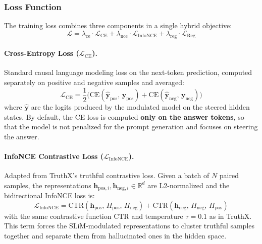 \subsubsection{Loss Function}

The training loss combines three components in a single hybrid objective:
\begin{equation}
\label{eq:slimtruth_loss}
\mathcal{L} = \lambda_{\mathrm{ce}} \cdot \mathcal{L}_{\mathrm{CE}} + \lambda_{\mathrm{nce}} \cdot \mathcal{L}_{\mathrm{InfoNCE}} + \lambda_{\mathrm{reg}} \cdot \mathcal{L}_{\mathrm{Reg}}
\end{equation}

\paragraph{Cross-Entropy Loss ($\mathcal{L}_{\mathrm{CE}}$).}
Standard causal language modeling loss on the next-token prediction, computed separately on positive and negative samples and averaged:
\begin{equation}
\label{eq:slimtruth_ce}
\mathcal{L}_{\mathrm{CE}} = \frac{1}{2}\Big(\mathrm{CE}(\hat{\mathbf{y}}_{\mathrm{pos}},\, \mathbf{y}_{\mathrm{pos}}) + \mathrm{CE}(\hat{\mathbf{y}}_{\mathrm{neg}},\, \mathbf{y}_{\mathrm{neg}})\Big)
\end{equation}
where $\hat{\mathbf{y}}$ are the logits produced by the modulated model on the steered hidden states. By default, the CE loss is computed \textbf{only on the answer tokens}, so that the model is not penalized for the prompt generation and focuses on steering the answer.

\paragraph{InfoNCE Contrastive Loss ($\mathcal{L}_{\mathrm{InfoNCE}}$).}
Adapted from TruthX's truthful contrastive loss. Given a batch of $N$ paired samples, the representations $\mathbf{h}_{\mathrm{pos},i}, \mathbf{h}_{\mathrm{neg},i} \in \mathbb{R}^{d}$ are L2-normalized and the bidirectional InfoNCE loss is:
\begin{equation}
\label{eq:slimtruth_nce}
\mathcal{L}_{\mathrm{InfoNCE}} = \mathrm{CTR}(\mathbf{h}_{\mathrm{pos}},\, H_{\mathrm{pos}},\, H_{\mathrm{neg}}) + \mathrm{CTR}(\mathbf{h}_{\mathrm{neg}},\, H_{\mathrm{neg}},\, H_{\mathrm{pos}})
\end{equation}
with the same contrastive function $\mathrm{CTR}$ and temperature $\tau = 0.1$ as in TruthX. This term forces the SLiM-modulated representations to cluster truthful samples together and separate them from hallucinated ones in the hidden space.

